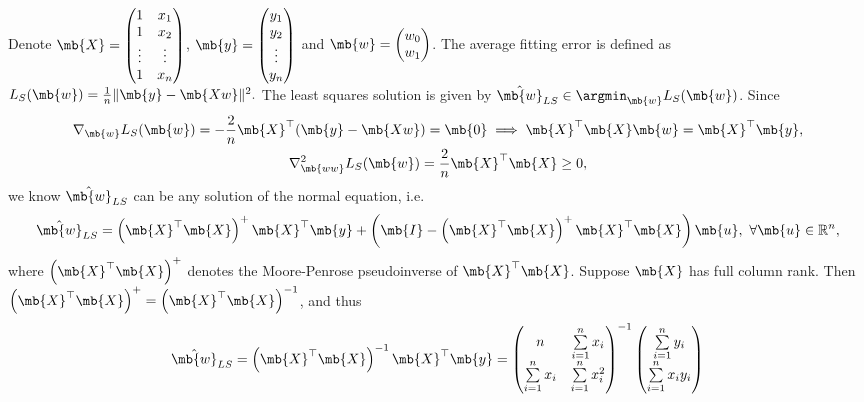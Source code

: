 \begin{exercise}
\begin{enumerate}
            \begin{solution}
                Denote $\mb{X} = \begin{pmatrix} 1 & x_1 \\ 1 & x_2 \\ \vdots & \vdots \\ 1 & x_n \end{pmatrix}$, $\mb{y} = \begin{pmatrix} y_1 \\ y_2 \\ \vdots \\ y_n \end{pmatrix}$ and $\mb{w} = \begin{pmatrix} w_0 \\ w_1 \end{pmatrix}$. 
                The average fitting error is defined as 
                $L_S(\mb{w}) = \frac{1}{n}\|\mb{y}-\mb{Xw}\|^2.$
                The least squares solution is given by $\hat{\mb{w}}_{LS} \in \argmin_\mb{w} L_S(\mb{w})$. Since \begin{gather*}
                    \nabla_\mb{w} L_S(\mb{w}) = -\frac{2}{n} \mb{X}^\top (\mb{y}-\mb{Xw})=\mb{0} \implies \mb{X}^\top\mb{X}\mb{w} = \mb{X}^\top\mb{y},\\
                    \nabla_\mb{ww}^2 L_S(\mb{w}) = \frac{2}{n} \mb{X}^\top\mb{X}\ge 0,
                \end{gather*}
                we know $\hat{\mb{w}}_{LS}$ can be any solution of the normal equation, i.e. $$\hat{\mb{w}}_{LS} = \left(\mb{X}^\top\mb{X}\right)^+\mb{X}^\top\mb{y} + \left(\mb{I}-\left(\mb{X}^\top\mb{X}\right)^+\mb{X}^\top\mb{X}\right)\mb{u}, \ \forall \mb{u} \in \mathbb{R}^n, $$ where $\left(\mb{X}^\top\mb{X}\right)^+$ denotes the Moore-Penrose pseudoinverse of $\mb{X}^\top\mb{X}$.
                Suppose $\mb{X}$ has full column rank. Then $\left(\mb{X}^\top\mb{X}\right)^+ = \left(\mb{X}^\top\mb{X}\right)^{-1}$, and thus $$\hat{\mb{w}}_{LS} = \left(\mb{X}^\top\mb{X}\right)^{-1}\mb{X}^\top\mb{y} =\begin{pmatrix}
                        n                       & \sum\limits_{i=1}^n x_i    \\
                        \sum\limits_{i=1}^n x_i & \sum\limits_{i=1}^n x_i^2
                    \end{pmatrix}^{-1}\begin{pmatrix}
                        \sum\limits_{i=1}^n y_i \\
                        \sum\limits_{i=1}^n x_iy_i

\end{pmatrix}$$
\end{solution}
\end{enumerate}
\end{exercise}
